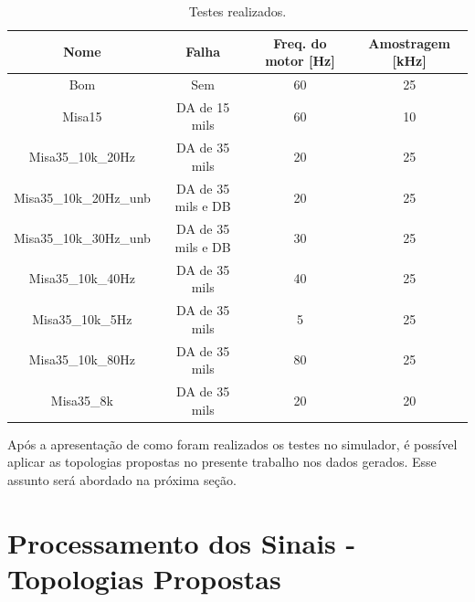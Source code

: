 \begin{table}[H]
    \caption{Testes realizados.}
    \label{tab:simulador}
    \centering%
    \begin{minipage}{\textwidth}
      \begin{tabular*}{\textwidth}{cccc}
        \hline
        {Nome}                   & Falha                     & Freq. do motor [Hz] & Amostragem [kHz]\\ \hline
        \hline
        Bom                      &  Sem                      &      60             &    25  \\ 
        Misa15                   &  DA de 15 mils            &      60             &    10  \\
        Misa35\_10k\_20Hz        &  DA de 35 mils            &      20             &    25  \\
        Misa35\_10k\_20Hz\_unb   &  DA de 35 mils e DB       &      20             &    25  \\
        Misa35\_10k\_30Hz\_unb   &  DA de 35 mils e DB       &      30             &    25  \\
        Misa35\_10k\_40Hz        &  DA de 35 mils            &      40             &    25  \\
        Misa35\_10k\_5Hz         &  DA de 35 mils            &      5              &    25  \\
        Misa35\_10k\_80Hz        &  DA de 35 mils            &      80             &    25  \\
        Misa35\_8k               &  DA de 35 mils            &      20             &    20  \\ \hline
      \end{tabular*}
    \end{minipage}
  \end{table}
  
Após a apresentação de como foram realizados os testes no simulador, é possível aplicar as topologias propostas no presente trabalho nos
dados gerados. Esse assunto será abordado na próxima seção.


% 

\section{Processamento dos Sinais - Topologias Propostas}

